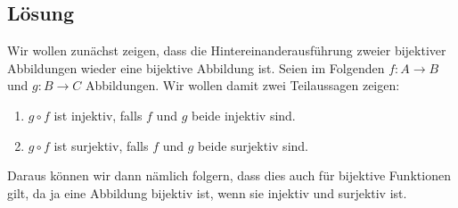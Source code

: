 \documentclass[german,12pt]{homework}
\begin{document}
    \subsection*{Lösung}
    Wir wollen zunächst zeigen, dass die Hintereinanderausführung zweier bijektiver Abbildungen wieder eine bijektive Abbildung ist. Seien im Folgenden \(f: A \to B\) und \(g: B \to C\) Abbildungen. Wir wollen damit zwei Teilaussagen zeigen:
    \begin{enumerate}
        \item \(g \circ f\) ist injektiv, falls \(f\) und \(g\) beide injektiv sind.
        \item \(g \circ f\) ist surjektiv, falls \(f\) und \(g\) beide surjektiv sind.
    \end{enumerate}
    Daraus können wir dann nämlich folgern, dass dies auch für bijektive Funktionen gilt, da ja eine Abbildung bijektiv ist, wenn sie injektiv und surjektiv ist.
\end{document}
